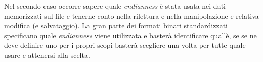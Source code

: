 Nel secondo caso occorre sapere quale \textit{endianness} è stata usata nei
dati memorizzati sul file e tenerne conto nella rilettura e nella
manipolazione e relativa modifica (e salvataggio). La gran parte dei formati
binari standardizzati specificano quale \textit{endianness} viene utilizzata e
basterà identificare qual'è, se se ne deve definire uno per i propri scopi
basterà scegliere una volta per tutte quale usare e attenersi alla scelta.




